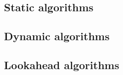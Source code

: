 \subsection{Static algorithms}
\label{sec:static}


\subsection{Dynamic algorithms}
\label{sec:dynamic}

\subsection{Lookahead algorithms}
\label{sec:lookahead_state}

\cite{arabnejad2014list} \cite{bittencourt2010dag}

\cleardoublepage

